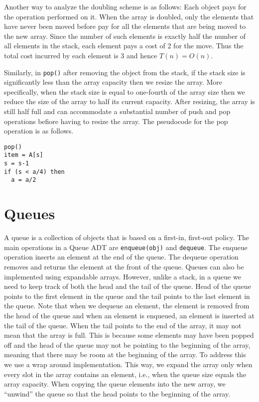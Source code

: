 \documentclass[11pt,twoside]{article}
\begin{document}
Another way to analyze the doubling scheme is as follows: Each object
pays for the operation performed on it. When the array is doubled,
only the elements that have never been moved before pay for all the
elements that are being moved to the new array. Since the number of
such elements is exactly half the number of all elements in the stack,
each element pays a cost of 2 for the move. Thus the total cost
incurred by each element is 3 and hence $T(n) = O(n)$.

Similarly, in \texttt{pop()} after removing the object from the stack,
if the stack size is significantly less than the array capacity then
we resize the array. More specifically, when the stack size is equal to
one-fourth of the array size then we reduce the size of the array
to half its current capacity. After resizing, the array is still half
full and can accommodate a substantial number of push and pop
operations befiore having to resize the array. The pseudocode for the
pop operation is as follows.
\begin{verbatim}
pop()
item = A[s]
s = s-1
if (s < a/4) then
  a = a/2
\end{verbatim}

\section*{Queues}
A queue is a collection of objects that is based on a first-in,
first-out policy. The main operations in a Queue ADT are
\texttt{enqueue(obj)} and \texttt{dequeue}. The enqueue operation
inserts an element at the end of the queue. The dequeue operation
removes and returns the element at the front of the queue. Queues can
also be implemented using expandable arrays. However, unlike a stack,
in a queue we need to keep track of both the head and the tail of the
queue. Head of the queue points to the first element in the queue and
the tail points to the last element in the queue. Note that when we
dequeue an element, the element is removed from the head of the queue
and when an element is enqueued, an element is inserted at the tail of
the queue. When the tail points to the end of the array, it may not
mean that the array is full. This is because some elements may have
been popped off and the head of the queue may not be pointing to the
beginning of the array, meaning that there may be room at the
beginning of the array. To address this we use a wrap around
implementation. This way, we expand the array only when every slot in
the array contains an element, i.e., when the queue size equals the
array capacity. When copying the queue elements into the new array, we
``unwind'' the queue so that the head points to the beginning of the
array. 
 
\end{document}
